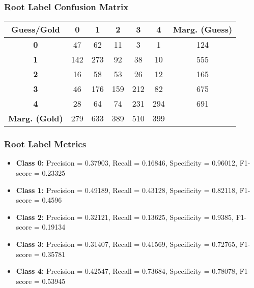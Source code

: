 \subsubsection{Root Label Confusion Matrix}
\begin{table}[h]
\centering
\begin{tabular}{c|ccccc|c}
\textbf{Guess/Gold} & \textbf{0} & \textbf{1} & \textbf{2} & \textbf{3} & \textbf{4} & \textbf{Marg. (Guess)} \\
\hline
\textbf{0} & 47 & 62 & 11 & 3 & 1 & 124 \\
\textbf{1} & 142 & 273 & 92 & 38 & 10 & 555 \\
\textbf{2} & 16 & 58 & 53 & 26 & 12 & 165 \\
\textbf{3} & 46 & 176 & 159 & 212 & 82 & 675 \\
\textbf{4} & 28 & 64 & 74 & 231 & 294 & 691 \\
\hline
\textbf{Marg. (Gold)} & 279 & 633 & 389 & 510 & 399 & \\
\end{tabular}
\end{table}

\subsubsection{Root Label Metrics}
\begin{itemize}
    \item \textbf{Class 0:} Precision = 0.37903, Recall = 0.16846, Specificity = 0.96012, F1-score = 0.23325
    \item \textbf{Class 1:} Precision = 0.49189, Recall = 0.43128, Specificity = 0.82118, F1-score = 0.4596
    \item \textbf{Class 2:} Precision = 0.32121, Recall = 0.13625, Specificity = 0.9385, F1-score = 0.19134
    \item \textbf{Class 3:} Precision = 0.31407, Recall = 0.41569, Specificity = 0.72765, F1-score = 0.35781
    \item \textbf{Class 4:} Precision = 0.42547, Recall = 0.73684, Specificity = 0.78078, F1-score = 0.53945
\end{itemize}

